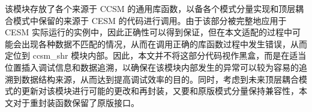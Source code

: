 该模块存放了各个来源于 CCSM 的通用库函数，以备各个模式分量实现和顶层耦合模式中保留的来源于 CESM 的代码进行调用。由于该部分被完整地应用于 CESM 实际运行的实例中，因此正确性可以得到保证，但在本文适配的过程中可能会出现各种数据不匹配的情况，从而在调用正确的库函数过程中发生错误，从而定位到 ccsm\_shr 模块内部。因此，本文并不将这部分代码视作黑盒，而是在适当位置插入调试信息和数据追溯，以确保在该模块内部发生的异常可以较为容易的追溯到数据结构来源，从而达到提高调试效率的目的。同时，考虑到未来顶层耦合模式的更新对该模块进行可能的更改和再封装，又要和原版模式分量保持兼容性，本文对于重封装函数保留了原版接口。
